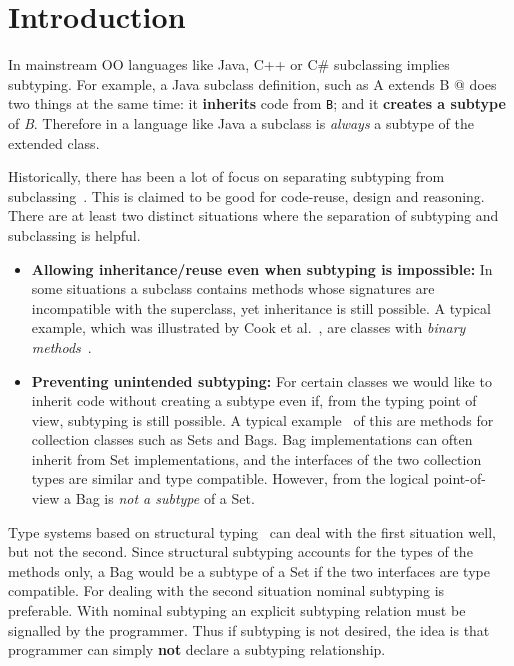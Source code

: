 \section{Introduction}\label{sec:intro}
In mainstream OO languages like Java, C++ or C\# subclassing 
implies subtyping. For example, a Java subclass definition, such as 
\Q@class A extends B {}@
\noindent does two things at the same time:
it {\bf inherits} code from \lstinline{B}; and it {\bf creates
a subtype} of \emph{B}. Therefore in a language like Java 
a subclass is \emph{always} a subtype of the extended class.

Historically, there has been a lot of focus on
separating subtyping from subclassing~\cite{cook}.  This is claimed to be
good for code-reuse, design and reasoning. There are at
least two distinct situations where the separation of subtyping and 
subclassing is helpful.

\begin{itemize}

\item {\bf Allowing inheritance/reuse even when subtyping is impossible:} 
In some situations a subclass contains methods whose signatures 
are incompatible with the superclass, yet inheritance is still
possible. A typical example, which was illustrated by Cook et al.~\cite{cook}, are 
classes with \emph{binary methods}~\cite{bruce96binary}.

\item {\bf Preventing unintended subtyping:} For certain classes we
  would like to inherit code without creating a subtype even if, from
  the typing point of view, subtyping is still possible. A typical
  example~\cite{LaLonde:1991:SSS:110673.110679} of this are methods for collection classes such as Sets and
  Bags. Bag implementations can often inherit 
  from Set implementations, and the interfaces of the two collection types are
  similar and type compatible. 
  However, from the logical point-of-view a Bag is \emph{not a
    subtype} of a Set. 

\end{itemize}

Type systems based on structural typing~\cite{cook} can deal with the first
situation well, but not the second. Since structural subtyping
accounts for the types of the methods only, a Bag would be a subtype
of a Set if the two interfaces are type compatible. For dealing with
the second situation nominal subtyping is preferable. With nominal
subtyping an explicit subtyping relation must be signalled by the
programmer. Thus if subtyping is not desired, the idea is that 
programmer can simply {\bf not} declare a subtyping relationship.

